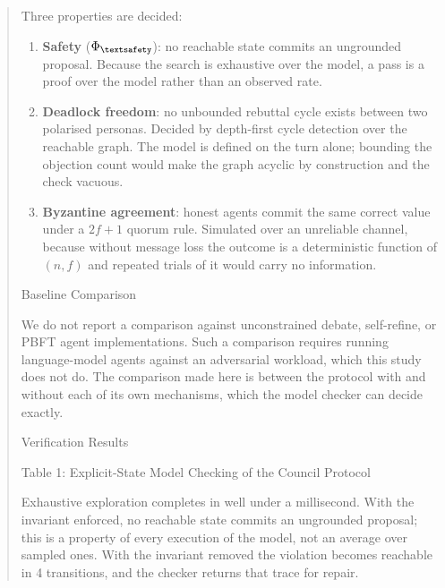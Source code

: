 \documentclass{article}
\begin{document}
\begin{quote}
{Three properties are decided:

\begin{enumerate}
  \item \textbf{Safety} ($\Phi_{\textsafety}$): no reachable state commits an ungrounded proposal. Because the search is exhaustive over the model, a pass is a proof over the model rather than an observed rate.
  \item \textbf{Deadlock freedom}: no unbounded rebuttal cycle exists between two polarised personas. Decided by depth-first cycle detection over the reachable graph. The model is defined on the turn alone; bounding the objection count would make the graph acyclic by construction and the check vacuous.
  \item \textbf{Byzantine agreement}: honest agents commit the same correct value under a $2f+1$ quorum rule. Simulated over an unreliable channel, because without message loss the outcome is a deterministic function of $(n, f)$ and repeated trials of it would carry no information.
\end{enumerate}

 Baseline Comparison

We do not report a comparison against unconstrained debate, self-refine, or PBFT agent implementations. Such a comparison requires running language-model agents against an adversarial workload, which this study does not do. The comparison made here is between the protocol with and without each of its own mechanisms, which the model checker can decide exactly.



 Verification Results

 Table 1: Explicit-State Model Checking of the Council Protocol
\begin{table}[htbp]
\centering
{}
\end{table}

Exhaustive exploration completes in well under a millisecond. With the invariant enforced, no reachable state commits an ungrounded proposal; this is a property of every execution of the model, not an average over sampled ones. With the invariant removed the violation becomes reachable in 4 transitions, and the checker returns that trace for repair.

}
\end{quote}
\end{document}
